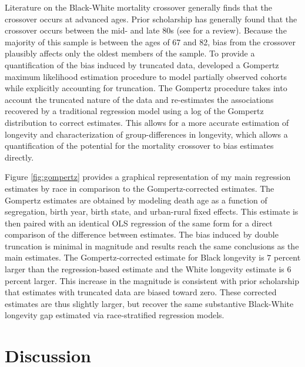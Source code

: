 \documentclass[11pt]{article}
\begin{document}
Literature on the Black-White mortality crossover generally finds that the crossover occurs at advanced ages. Prior scholarship has generally found that the crossover occurs between the mid- and late 80s (see \citealp{breen_black_2026} for a review). Because the majority of this sample is between the ages of 67 and 82, bias from the crossover plausibly affects only the oldest members of the sample. To provide a quantification of the bias induced by truncated data, \citet{goldstein_mortality_2023} developed a Gompertz maximum likelihood estimation procedure to model partially observed cohorts while explicitly accounting for truncation. The Gompertz procedure takes into account the truncated nature of the data and re-estimates the associations recovered by a traditional regression model using a log of the Gompertz distribution to correct estimates. This allows for a more accurate estimation of longevity and characterization of group-differences in longevity, which allows a quantification of the potential for the mortality crossover to bias estimates directly.

Figure \ref{fig:gompertz} provides a graphical representation of my main regression estimates by race in comparison to the Gompertz-corrected estimates. The Gompertz estimates are obtained by modeling death age as a function of segregation, birth year, birth state, and urban-rural fixed effects. This estimate is then paired with an identical OLS regression of the same form for a direct comparison of the difference between estimates. The bias induced by double truncation is minimal in magnitude and results reach the same conclusions as the main estimates. The Gompertz-corrected estimate for Black longevity is $7$ percent larger than the regression-based estimate and the White longevity estimate is $6$ percent larger. This increase in the magnitude is consistent with prior scholarship that estimates with truncated data are biased toward zero. These corrected estimates are thus slightly larger, but recover the same substantive Black-White longevity gap estimated via race-stratified regression models.

\section{Discussion}
\end{document}
